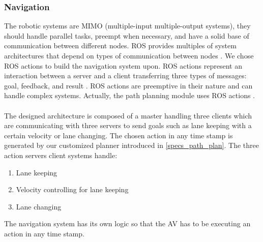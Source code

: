 \subsubsection{Navigation}
\label{specs_nav}

The robotic systems are MIMO (multiple-input multiple-output systems), they should handle parallel tasks, preempt when necessary, and have a solid base of communication between different nodes. ROS provides multiples of system architectures that depend on types of communication between nodes \cite{ROSBookMorgan}. We chose ROS actions to build the navigation system upon. ROS actions represent an interaction between a server and a client transferring three types of messages: goal, feedback, and result \cite{actionlib}. ROS actions are preemptive in their nature and can handle complex systems. Actually, the path planning module uses ROS actions \cite{ROSBookMorgan}.
\\ \\
The designed architecture is composed of a master handling three clients which are communicating with three servers to send goals such as lane keeping with a certain velocity or lane changing. The chosen action in any time stamp is generated by our customized planner introduced in \ref{specs_path_plan}.
The three action servers client systems handle:
\begin{enumerate}
    \item Lane keeping
    \item Velocity controlling for lane keeping
    \item Lane changing
\end{enumerate}
The navigation system has its own logic so that the AV has to be executing an action in any time stamp. 
